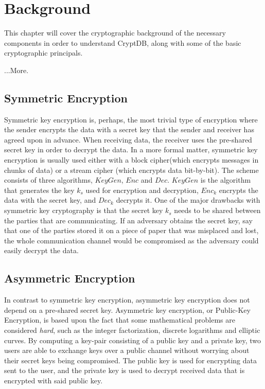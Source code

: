 \chapter{Background}
\label{chp:background}

This chapter will cover the cryptographic background of the necessary components in order to understand CryptDB, along with some of the basic cryptographic principals.

...More.

\section{Symmetric Encryption}

Symmetric key encryption is, perhaps, the most trivial type of encryption where the sender encrypts the data with a secret key that the sender and receiver has agreed upon in advance. When receiving data, the receiver uses the pre-shared secret key in order to decrypt the data. In a more formal matter, symmetric key encryption is usually used either with a block cipher(which encrypts messages in chunks of data) or a stream cipher (which encrypts data bit-by-bit). The scheme consists of three algorithms, $KeyGen$, $Enc$ and $Dec$. $KeyGen$ is the algorithm that generates the key $k_s$ used for encryption and decryption, $Enc_k$ encrypts the data with the secret key, and $Dec_k$ decrypts it. One of the major drawbacks with symmetric key cryptography is that the secret key $k_s$ needs to be shared between the parties that are communicating. If an adversary obtains the secret key, say that one of the parties stored it on a piece of paper that was misplaced and lost, the whole communication channel would be compromised as the adversary could easily decrypt the data.

\section{Asymmetric Encryption}

In contrast to symmetric key encryption, asymmetric key encryption does not depend on a pre-shared secret key. Asymmetric key encryption, or Public-Key Encryption, is based upon the fact that some mathematical problems are considered \emph{hard}, such as the integer factorization, discrete logarithms and elliptic curves. By computing a key-pair consisting of a public key and a private key, two users are able to exchange keys over a public channel without worrying about their secret keys being compromised. The public key is used for encrypting data sent to the user, and the private key is used to decrypt received data that is encrypted with said public key.



